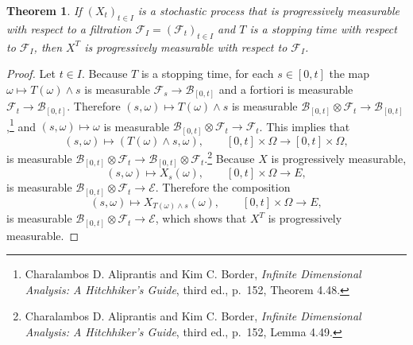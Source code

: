 \documentclass{article}
\theoremstyle{plain}
\newtheorem{theorem}{Theorem}
\theoremstyle{definition}
\begin{document}
\begin{theorem}
If $(X_t)_{t \in I}$ is a stochastic process  that is progressively measurable with respect
to a filtration $\mathscr{F}_I = (\mathscr{F}_t)_{t \in I}$ and 
 $T$ is a stopping time with respect
to $\mathscr{F}_I$, then
$X^T$ is  progressively measurable with respect to $\mathscr{F}_I$.
\end{theorem}
\begin{proof}
Let $t \in I$. 
Because $T$ is a stopping time, for each $s \in [0,t]$ the map $\omega \mapsto T(\omega) \wedge s$ 
is measurable $\mathscr{F}_s \to \mathscr{B}_{[0,t]}$ and a fortiori is measurable $\mathscr{F}_t \to  \mathscr{B}_{[0,t]}$. 
Therefore  $(s,\omega) \mapsto T(\omega) \wedge s$
is measurable $\mathscr{B}_{[0,t]} \otimes \mathscr{F}_t \to \mathscr{B}_{[0,t]}$,\footnote{Charalambos D. Aliprantis and Kim C. Border, {\em Infinite Dimensional Analysis:
A Hitchhiker's Guide}, third ed., p.~152, Theorem 4.48.} and 
$(s,\omega) \mapsto \omega$ is measurable $\mathscr{B}_{[0,t]} \otimes \mathscr{F}_t \to \mathscr{F}_t$. 
This implies that
\[
(s,\omega) \mapsto (T(\omega) \wedge s,\omega), \qquad [0,t] \times \Omega \to [0,t] \times \Omega,
\]
is measurable 
$\mathscr{B}_{[0,t]} \otimes \mathscr{F}_t \to \mathscr{B}_{[0,t]} \otimes \mathscr{F}_t$.\footnote{Charalambos D. Aliprantis and Kim C. Border, {\em Infinite Dimensional Analysis:
A Hitchhiker's Guide}, third ed., p.~152, Lemma 4.49.}
Because $X$ is progressively measurable,
\[
(s,\omega) \mapsto X_s(\omega), \qquad [0,t] \times \Omega \to E,
\]
is measurable $\mathscr{B}_{[0,t]} \otimes \mathscr{F}_t \to \mathscr{E}$.  Therefore
the composition 
\[
(s,\omega) \mapsto X_{T(\omega) \wedge s}(\omega), \qquad [0,t] \times \Omega \to E,
\]
is measurable $\mathscr{B}_{[0,t]} \otimes \mathscr{F}_t  \to \mathscr{E}$, which shows that
$X^T$ is progressively measurable.
\end{proof}
\end{document}
